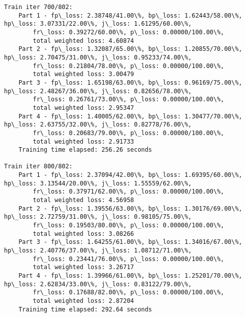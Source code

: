 \documentclass[11pt]{article}
\begin{document}
\begin{Verbatim}[commandchars=\\\{\}]
Train iter 700/802:
	Part 1 - fp\_loss: 2.38748/41.00\%, bp\_loss: 1.62443/58.00\%, hp\_loss: 3.07331/22.00\%, j\_loss: 1.61295/60.00\%, 
		fr\_loss: 0.39272/60.00\%, p\_loss: 0.00000/100.00\%, 
		total weighted loss: 4.60874
	Part 2 - fp\_loss: 1.32087/65.00\%, bp\_loss: 1.20855/70.00\%, hp\_loss: 2.70475/31.00\%, j\_loss: 0.95233/74.00\%, 
		fr\_loss: 0.21804/78.00\%, p\_loss: 0.00000/100.00\%, 
		total weighted loss: 3.00479
	Part 3 - fp\_loss: 1.65198/63.00\%, bp\_loss: 0.96169/75.00\%, hp\_loss: 2.48267/36.00\%, j\_loss: 0.82656/78.00\%, 
		fr\_loss: 0.26761/73.00\%, p\_loss: 0.00000/100.00\%, 
		total weighted loss: 2.95347
	Part 4 - fp\_loss: 1.40005/62.00\%, bp\_loss: 1.30477/70.00\%, hp\_loss: 2.63755/32.00\%, j\_loss: 0.82778/76.00\%, 
		fr\_loss: 0.20683/79.00\%, p\_loss: 0.00000/100.00\%, 
		total weighted loss: 2.91733
	Training time elapsed: 256.26 seconds

Train iter 800/802:
	Part 1 - fp\_loss: 2.37094/42.00\%, bp\_loss: 1.69395/60.00\%, hp\_loss: 3.13544/20.00\%, j\_loss: 1.55559/62.00\%, 
		fr\_loss: 0.37971/62.00\%, p\_loss: 0.00000/100.00\%, 
		total weighted loss: 4.56958
	Part 2 - fp\_loss: 1.39556/63.00\%, bp\_loss: 1.30176/69.00\%, hp\_loss: 2.72759/31.00\%, j\_loss: 0.98105/75.00\%, 
		fr\_loss: 0.19503/80.00\%, p\_loss: 0.00000/100.00\%, 
		total weighted loss: 3.08266
	Part 3 - fp\_loss: 1.64255/61.00\%, bp\_loss: 1.34016/67.00\%, hp\_loss: 2.40776/37.00\%, j\_loss: 1.08712/71.00\%, 
		fr\_loss: 0.23441/76.00\%, p\_loss: 0.00000/100.00\%, 
		total weighted loss: 3.26717
	Part 4 - fp\_loss: 1.39966/61.00\%, bp\_loss: 1.25201/70.00\%, hp\_loss: 2.62834/33.00\%, j\_loss: 0.83122/79.00\%, 
		fr\_loss: 0.17688/82.00\%, p\_loss: 0.00000/100.00\%, 
		total weighted loss: 2.87204
	Training time elapsed: 292.64 seconds


\end{Verbatim}
\end{document}
